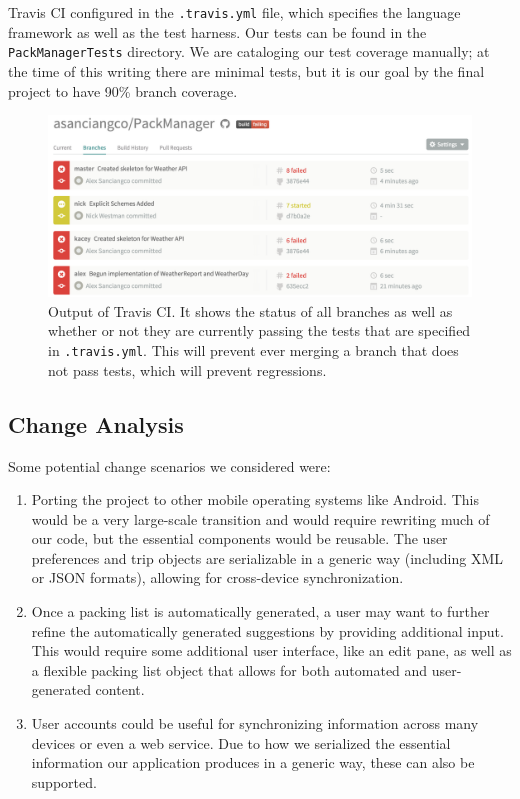 \documentclass[11pt]{article}
\begin{document}
Travis CI configured in the \texttt{.travis.yml} file, which specifies the language framework as well as the test harness. Our tests can be found in the \texttt{PackManagerTests} directory. We are cataloging our test coverage manually; at the time of this writing there are minimal tests, but it is our goal by the final project to have 90\% branch coverage. %


\begin{figure}
\centering
\includegraphics[width=\linewidth]{img/travis.png}
\caption{Output of Travis CI. It shows the status of all branches as well as whether or not they are currently passing the tests that are specified in \texttt{.travis.yml}. This will prevent ever merging a branch that does not pass tests, which will prevent regressions.}
\label{fig:travis}
\end{figure}

\subsection{Change Analysis}
Some potential change scenarios we considered were:

\begin{enumerate}
\item Porting the project to other mobile operating systems like Android. This would be a very large-scale transition and would require rewriting much of our code, but the essential components would be reusable. The user preferences and trip objects are serializable in a generic way (including XML or JSON formats), allowing for cross-device synchronization.
\item Once a packing list is automatically generated, a user may want to further refine the automatically generated suggestions by providing additional input. This would require some additional user interface, like an edit pane, as well as a flexible packing list object that allows for both automated and user-generated content.
\item User accounts could be useful for synchronizing information across many devices or even a web service. Due to how we serialized the essential information our application produces in a generic way, these can also be supported.
\end{enumerate}
\end{document}
